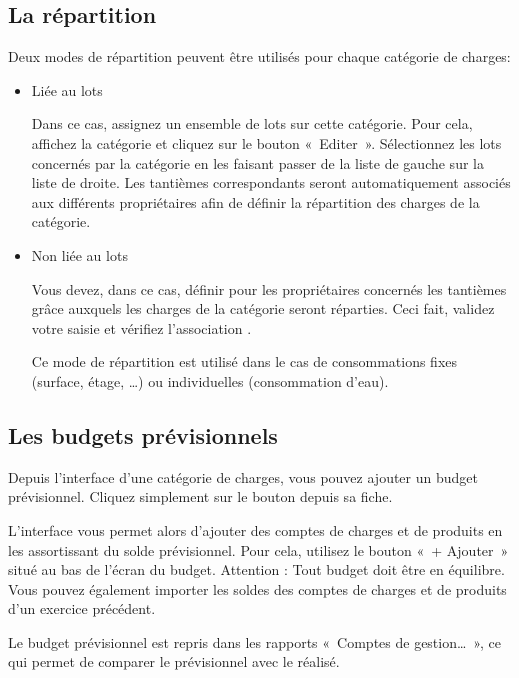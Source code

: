 \documentclass[a4paper,10pt,oneside,french]{sphinxmanual}
\begin{document}
\subsection{La répartition}
\label{\detokenize{condominium/classloads:la-repartition}}
Deux modes de répartition peuvent être utilisés pour chaque catégorie de charges:
\begin{itemize}
\item {} 
Liée au lots

Dans ce cas, assignez un ensemble de lots sur cette catégorie. Pour cela, affichez la catégorie et cliquez sur le bouton « Editer ». Sélectionnez les lots concernés par la catégorie en les faisant passer de la liste de gauche sur la liste de droite.
Les tantièmes correspondants seront automatiquement associés aux différents propriétaires afin de définir la répartition des charges de la catégorie.

\item {} 
Non liée au lots

Vous devez, dans ce cas, définir pour les propriétaires concernés les tantièmes grâce auxquels les charges de la catégorie seront réparties.  Ceci fait, validez votre saisie et vérifiez l’association .

Ce mode de répartition est utilisé dans le cas de consommations fixes (surface, étage, …) ou individuelles (consommation d’eau).

\end{itemize}


\subsection{Les budgets prévisionnels}
\label{\detokenize{condominium/classloads:les-budgets-previsionnels}}
Depuis l’interface d’une catégorie de charges, vous pouvez ajouter un budget prévisionnel.
Cliquez simplement sur le bouton  depuis sa fiche.

L’interface vous permet alors d’ajouter des comptes de charges et de produits en les assortissant du solde prévisionnel. Pour cela, utilisez le bouton « + Ajouter » situé au bas de l’écran du budget. Attention : Tout budget doit être en équilibre.
Vous pouvez également importer les soldes des comptes de charges et de produits d’un exercice précédent.

Le budget prévisionnel est repris dans les rapports « Comptes de gestion… », ce qui permet de comparer le prévisionnel avec le réalisé.
\end{document}
